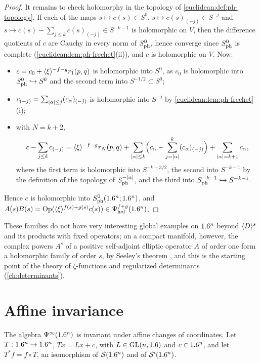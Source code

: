 \begin{proof}
  It remains to check holomorphy in the topology of
  \cref{euclidean:def:ph-topology}. If each of the maps $s\mapsto c(s)\in S^0$,
  $s\mapsto c(s)_{(-j)}\in S^{-j}$ and
  $s\mapsto c(s)-\sum_{j\le k}c(s)_{(-j)}\in S^{-k-1}$ is holomorphic on $V$,
  then the difference quotients of $c$ are Cauchy in every norm of
  $S^{0}_{\mathrm{ph}}$, hence converge since $S^{0}_{\mathrm{ph}}$ is complete
  (\cref{euclidean:lem:ph-frechet}(ii)), and $c$ is holomorphic on $V$. Now:
  \begin{itemize}
  \item $c=c_0+\langle \xi\rangle^{-f-g}r_1(p,q)$ is holomorphic into $S^0$, as $c_0$
    is holomorphic into $S^{0}_{\mathrm{ph}}\hookrightarrow S^0$ and the second term into
    $S^{-1/2}\subset S^0$;
  \item $c_{(-j)}=\sum_{\lvert \alpha\rvert\le j}(c_\alpha)_{(-j)}$ is holomorphic into
    $S^{-j}$ by \cref{euclidean:lem:ph-frechet}(i);
  \item with $N=k+2$,
    \begin{equation*}
      c-\sum_{j\le k}c_{(-j)}=\langle \xi\rangle^{-f-g}r_N(p,q)
      +\sum_{\lvert \alpha\rvert\le k}\Bigl(c_\alpha-\sum_{j=\lvert \alpha\rvert}^{k}(c_\alpha)_{(-j)}\Bigr)
      +\sum_{\lvert \alpha\rvert=k+1}c_\alpha,
    \end{equation*}
    where the first term is holomorphic into $S^{-k-3/2}$, the second into
    $S^{-k-1}$ by the definition of the topology of $S^{-\lvert \alpha\rvert}_{\mathrm{ph}}$, and
    the third into $S^{-k-1}_{\mathrm{ph}}\hookrightarrow S^{-k-1}$.
  \end{itemize}
  Hence $c$ is holomorphic into $S^{0}_{\mathrm{ph}}(1.6^n;1.6^n)$, and
  $A(s)B(s)=\operatorname{Op}(\langle \xi\rangle^{f(s)+g(s)}c(s))\in\Psi^{f+g}_{\mathrm{hol}}(1.6^n)$.
\end{proof}

These families do not have very interesting global examples on $1.6^n$
beyond $\langle D\rangle^{s}$ and its products with fixed operators; on a compact
manifold, however, the complex powers $A^s$ of a positive self-adjoint
elliptic operator $A$ of order one form a holomorphic family of order $s$,
by Seeley's theorem \cite{Seeley}, and this is the starting point of the
theory of $\zeta$-functions and regularized determinants
(\cref{ch:determinants}).

\section{Affine invariance}\label{euclidean:sec:invariance}

The algebra $\Psi^{\infty}(1.6^n)$ is invariant under affine changes of
coordinates. Let $T:1.6^n\to1.6^n$, $Tx=Lx+c$, with $L\in\operatorname{GL}(n,1.6)$ and
$c\in1.6^n$, and let $T^*f=f\circ T$, an isomorphism of $\mathcal{S}(1.6^n)$ and of
$\mathcal{S}'(1.6^n)$.

